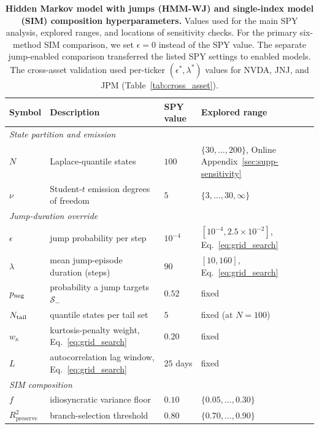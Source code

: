 
\begin{table}[H]
\centering
\caption{\textbf{Hidden Markov model with jumps (HMM-WJ) and
    single-index model (SIM) composition hyperparameters.} Values
    used for the main SPY analysis, explored ranges, and locations of
    sensitivity checks. For the primary six-method SIM comparison, we set
    $\epsilon = 0$ instead of the SPY value. The separate jump-enabled
    comparison transferred the listed SPY settings to enabled models. The cross-asset
    validation used per-ticker $(\epsilon^{*}, \lambda^{*})$ values
    for NVDA, JNJ, and JPM (Table~\ref{tab:cross_asset}).}
\label{tab:hyperparams}
\small
\begin{tabular}{@{}llll@{}}
\toprule
\textbf{Symbol} & \textbf{Description} & \textbf{SPY value} & \textbf{Explored range} \\ \midrule
\multicolumn{4}{l}{\textit{State partition and emission}} \\[2pt]
$N$            & Laplace-quantile states                      & $100$     & $\{30,\dots,200\}$, Online Appendix~\ref{sec:supp-sensitivity} \\
$\nu$          & Student-$t$ emission degrees of freedom      & $5$       & $\{3,\dots,30,\infty\}$ \\[4pt]
\multicolumn{4}{l}{\textit{Jump-duration override}} \\[2pt]
$\epsilon$     & jump probability per step                    & $10^{-4}$ & $[10^{-4}, 2.5\times10^{-2}]$, Eq.~\eqref{eq:grid_search} \\
$\lambda$      & mean jump-episode duration (steps)           & $90$      & $[10, 160]$, Eq.~\eqref{eq:grid_search} \\
$p_{\rm neg}$  & probability a jump targets $\mathcal{S}_{-}$ & $0.52$    & fixed \\
$N_{\rm tail}$ & quantile states per tail set                 & $5$       & fixed (at $N = 100$) \\
$w_\kappa$     & kurtosis-penalty weight, Eq.~\eqref{eq:grid_search} & $0.20$ & fixed \\
$L$            & autocorrelation lag window, Eq.~\eqref{eq:grid_search} & $25$ days & fixed \\[4pt]
\multicolumn{4}{l}{\textit{SIM composition}} \\[2pt]
$f$                        & idiosyncratic variance floor & $0.10$ & $\{0.05,\dots,0.30\}$ \\
$R^2_{\mathrm{preserve}}$  & branch-selection threshold   & $0.80$ & $\{0.70,\dots,0.90\}$ \\
\bottomrule
\end{tabular}
\end{table}

